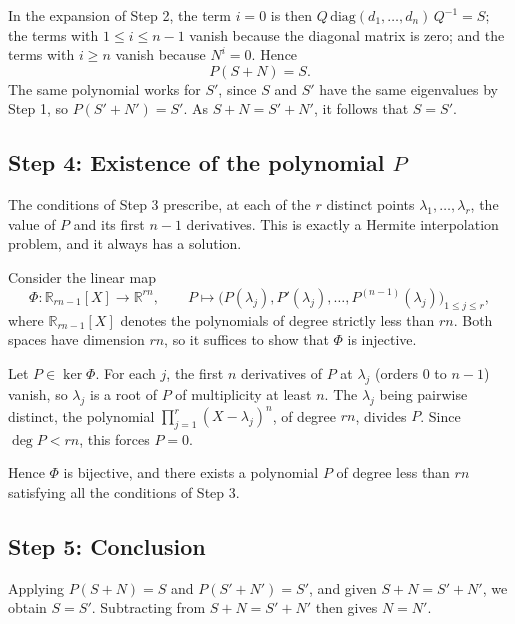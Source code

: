 \documentclass{article}
\begin{document}
In the expansion of Step 2, the term \( i = 0 \) is then
\( Q\,\mathrm{diag}(d_1, \dots, d_n)\,Q^{-1} = S \); the terms with
\( 1 \le i \le n-1 \) vanish because the diagonal matrix is zero; and the terms with
\( i \ge n \) vanish because \( N^i = 0 \). Hence
\[
  P(S+N) = S .
\]
The same polynomial works for \( S' \), since \( S \) and \( S' \) have the same
eigenvalues by Step 1, so \( P(S' + N') = S' \). As \( S + N = S' + N' \), it follows
that \( S = S' \).

\subsection{Step 4: Existence of the polynomial \( P \)}

The conditions of Step 3 prescribe, at each of the \( r \) distinct points
\( \lambda_1, \dots, \lambda_r \), the value of \( P \) and its first \( n-1 \)
derivatives. This is exactly a Hermite interpolation problem, and it always has a
solution.

Consider the linear map
\[
  \Phi : \mathbb{R}_{rn-1}[X] \longrightarrow \mathbb{R}^{rn}, \qquad
  P \longmapsto \Big( P(\lambda_j), P'(\lambda_j), \dots, P^{(n-1)}(\lambda_j) \Big)_{1 \le j \le r},
\]
where \( \mathbb{R}_{rn-1}[X] \) denotes the polynomials of degree strictly less than
\( rn \). Both spaces have dimension \( rn \), so it suffices to show that \( \Phi \) is
injective.

Let \( P \in \ker \Phi \). For each \( j \), the first \( n \) derivatives of \( P \) at
\( \lambda_j \) (orders \( 0 \) to \( n-1 \)) vanish, so \( \lambda_j \) is a root of
\( P \) of multiplicity at least \( n \). The \( \lambda_j \) being pairwise distinct, the
polynomial \( \prod_{j=1}^{r} (X - \lambda_j)^n \), of degree \( rn \), divides \( P \).
Since \( \deg P < rn \), this forces \( P = 0 \).

Hence \( \Phi \) is bijective, and there exists a polynomial \( P \) of degree less than
\( rn \) satisfying all the conditions of Step 3.

\subsection{Step 5: Conclusion}

Applying \( P(S + N) = S \) and \( P(S' + N') = S' \), and given \( S + N = S' + N' \), we
obtain \( S = S' \). Subtracting from \( S + N = S' + N' \) then gives \( N = N' \).
\end{document}
